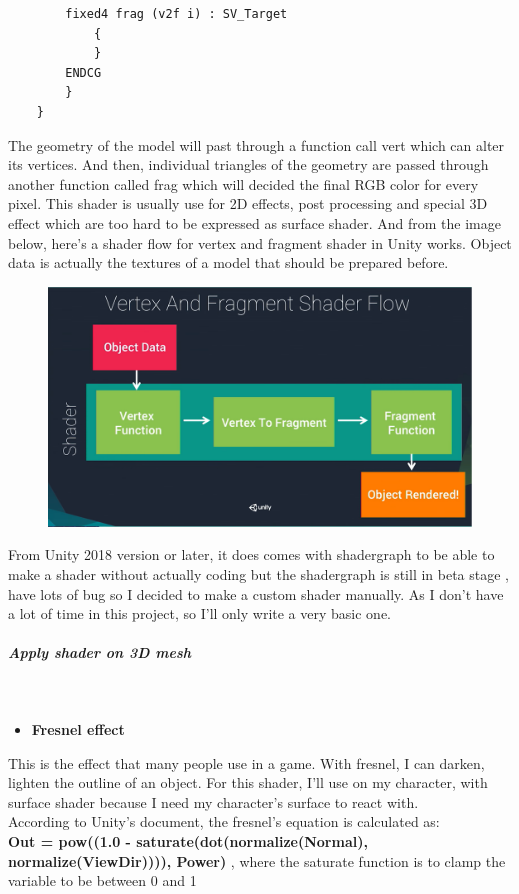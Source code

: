 \documentclass[a4paper, 13pt]{extarticle}
\begin{document}
{\begin{itemize}
\begin{lstlisting}
 		fixed4 frag (v2f i) : SV_Target
 			{
 			}
 		ENDCG
 		}
 	}
 \end{lstlisting}
 \end{itemize}
The geometry of the model will past through a function call vert which can alter its vertices. And then, individual triangles of the geometry are passed through another function called frag which will decided the final RGB color for every pixel. This shader is usually use for 2D effects, post processing and special 3D effect which are too hard to be expressed as surface shader. And from the image below, here's a shader flow for vertex and fragment shader in Unity works. Object data is actually the textures of a model that should be prepared before.
   \begin{figure}[h]
	\begin{minipage}{1\textwidth}
		\centering
		\includegraphics[width=0.55\linewidth]{intructions/vertex_fragment_flow.png}
		\label{fig:test29}
		\centering
	\end{minipage}
\end{figure}
From Unity 2018 version or later, it does comes with shadergraph to be able to make a shader without actually coding but the shadergraph is still in beta stage , have lots of bug so I decided to make a custom shader manually. As I don't have a lot of time in this project, so I'll only write a very basic one. 
 \subparagraph{Apply shader on 3D mesh} ~\\[-0.8cm]
 \begin{itemize}
 	\item \bfseries Fresnel effect
 \end{itemize}
   This is the effect that many people use in a game. With fresnel, I can darken, lighten the outline of an object. For this shader, I'll use on my character, with surface shader because I need my character's surface to react with. \\[0.01cm] According to Unity's document, the fresnel's equation is calculated as: \\ {\bfseries Out = pow((1.0 - saturate(dot(normalize(Normal), normalize(ViewDir)))), Power) }, where the saturate function is to clamp the variable to be between 0 and 1 \\
}
\end{document}
